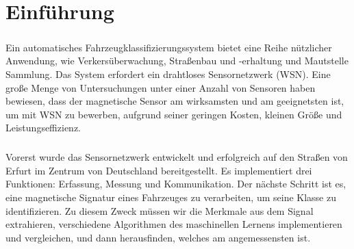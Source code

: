 \chapter*{Einf\"uhrung}

\paragraph{}
Ein automatisches Fahrzeugklassifizierungssystem bietet eine Reihe n\"utzlicher
Anwendung, wie Verkers\"uberwachung, Stra\ss{}enbau und -erhaltung und
Mautstelle Sammlung. Das System erfordert ein drahtloses Sensornetzwerk (WSN).
Eine gro\ss{}e Menge von Untersuchungen unter einer Anzahl von Sensoren haben
bewiesen, dass der magnetische Sensor am wirksamsten und am geeignetsten ist, um
mit WSN zu bewerben, aufgrund seiner geringen Kosten, kleinen Gr\"o\ss{}e und
Leistungseffizienz.

\paragraph{}
Vorerst wurde das Sensornetzwerk entwickelt \cite{sensor15} und erfolgreich
auf den Stra\ss{}en von Erfurt im Zentrum von Deutschland bereitgestellt.
Es implementiert drei Funktionen: Erfassung, Messung und Kommunikation.
Der n\"achste Schritt ist es, eine magnetische Signatur eines Fahrzeuges zu
verarbeiten, um seine Klasse zu identifizieren. Zu diesem Zweck m\"ussen wir
die Merkmale aus dem Signal extrahieren, verschiedene Algorithmen des
maschinellen Lernens implementieren und vergleichen, und dann herausfinden,
welches am angemessensten ist.